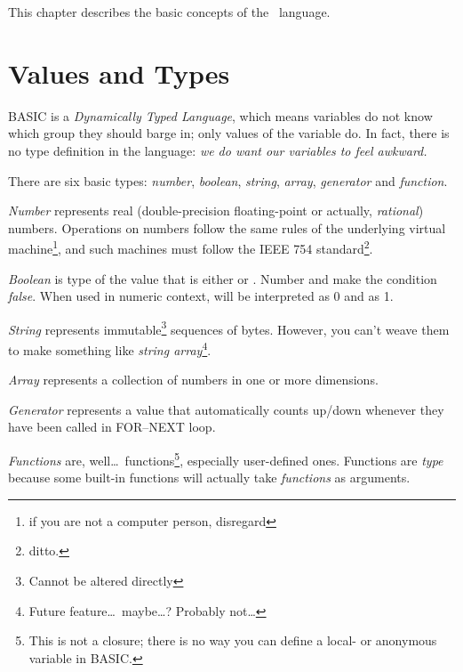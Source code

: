 \quad
{}

This chapter describes the basic concepts of the \tbas\ language.


\section{Values and Types}
\label{valuesandtypes}

BASIC is a \emph{Dynamically Typed Language}, which means variables do not know which group they should barge in; only values of the variable do. In fact, there is no type definition in the language: \emph{we do want our variables to feel awkward.}

There are six basic types: \emph{number}, \emph{boolean}, \emph{string},  \emph{array}, \emph{generator} and \emph{function}.

\emph{Number} represents real (double-precision floating-point or actually, \emph{rational}) numbers. Operations on numbers follow the same rules of the underlying virtual machine\footnote{if you are not a computer person, disregard}, and such machines must follow the IEEE 754 standard\footnote{ditto.}. 

\emph{Boolean} is type of the value that is either  or . Number  and  make the condition \emph{false}. When used in numeric context,  will be interpreted as 0 and  as 1.

\emph{String} represents immutable\footnote{Cannot be altered directly} sequences of bytes. However, you can't weave them to make something like \emph{string array}\footnote{Future feature\ldots\ maybe\ldots? Probably not\ldots}.

\emph{Array} represents a collection of numbers in one or more dimensions.

\emph{Generator} represents a value that automatically counts up/down whenever they have been called in FOR--NEXT loop.

\emph{Functions} are, well\ldots\ functions\footnote{This is not a closure; there is no way you can define a local- or anonymous variable in BASIC.}, especially user-defined ones. Functions are \emph{type} because some built-in functions will actually take \emph{functions} as arguments.

